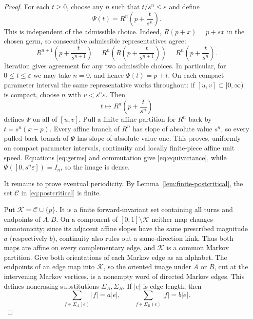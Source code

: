 \documentclass[11pt]{article}
\newcommand{\I}{[0,1]}
\begin{document}
\begin{proof}
For each $t\geq0$, choose any $n$ such that $t/s^n\leq\varepsilon$ and define
\begin{equation}\label{eq:Psi}
\Psi(t)=R^n\left(p+\frac{t}{s^n}\right).
\end{equation}
This is independent of the admissible choice. Indeed, $R(p+x)=p+sx$ in the chosen germ, so
consecutive admissible representatives agree:
\[
R^{n+1}\left(p+\frac{t}{s^{n+1}}\right)
=R^n\left(R\left(p+\frac{t}{s^{n+1}}\right)\right)
=R^n\left(p+\frac{t}{s^n}\right).
\]
Iteration gives agreement for any two admissible choices. In particular, for $0\leq t\leq\varepsilon$
we may take $n=0$, and hence $\Psi(t)=p+t$.
On each compact parameter interval
the same representative works throughout: if $[u,v]\subset[0,\infty)$ is compact, choose $n$ with
$v<s^n\varepsilon$. Then
\[
t\longmapsto R^n\left(p+\frac{t}{s^n}\right)
\]
defines $\Psi$ on all of $[u,v]$. Pull a finite affine partition for $R^n$ back by
$t=s^n(x-p)$. Every affine branch of $R^n$ has slope of absolute value $s^n$, so every pulled-back
branch of $\Psi$ has slope of absolute value one. This proves, uniformly on compact parameter intervals,
continuity and locally finite-piece affine unit speed. Equations \eqref{eq:germs} and commutation give \eqref{eq:equivariance}, while
$\Psi([0,s^n\varepsilon])=I_n$, so the image is dense.

It remains to prove eventual periodicity. By Lemma~\ref{lem:finite-postcritical}, the set
$\mathcal C$ in \eqref{eq:postcritical} is finite.

Put $\mathcal K=\mathcal C\cup\{p\}$. It is a finite forward-invariant set containing all turns and
endpoints of $A,B$. On a component of $\I\setminus\mathcal K$ neither map changes monotonicity; since
its adjacent affine slopes have the same prescribed magnitude $a$ (respectively $b$), continuity also
rules out a same-direction kink. Thus both maps are affine on every complementary edge, and
$\mathcal K$ is a common Markov partition. Give both orientations of each Markov edge as an alphabet.
The endpoints of an edge map into $\mathcal K$, so the oriented image under $A$ or $B$, cut at the
intervening Markov vertices, is a nonempty word of directed Markov edges. This defines nonerasing
substitutions $\Sigma_A,\Sigma_B$.
If $|e|$ is edge length, then
\begin{equation}\label{eq:length-sub}
\sum_{f\in\Sigma_A(e)}|f|=a|e|,
\qquad
\sum_{f\in\Sigma_B(e)}|f|=b|e|.
\end{equation}


\end{proof}
\end{document}
